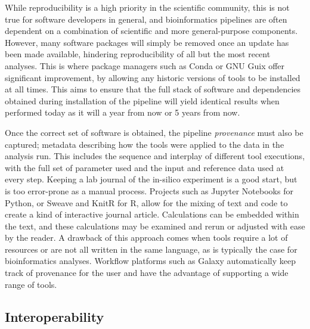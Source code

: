 \begin{justify}
While reproducibility is a high priority in the scientific community, this is not true for software developers in general, and bioinformatics pipelines are often dependent on a combination of scientific and more general-purpose components. However, many software packages will simply be removed once an update has been made available, hindering reproducibility of all but the most recent analyses. This is where package managers such as Conda \cite{conda} or GNU Guix \cite{courtes2013functional} offer significant improvement, by allowing any historic versions of tools to be installed at all times. This aims to ensure that the full stack of software and dependencies obtained during installation of the pipeline will yield identical results when performed today as it will a year from now or 5 years from now.

Once the correct set of software is obtained, the pipeline \emph{provenance} must also be captured; metadata describing how the tools were applied to the data in the analysis run. This includes the sequence and interplay of different tool executions, with the full set of parameter used and the input and reference data used at every step. Keeping a lab journal of the in-silico experiment is a good start, but is too error-prone as a manual process. Projects such as Jupyter Notebooks \cite{kluyver2016jupyter} for Python, or Sweave \cite{leisch2002sweave} and KnitR \cite{xie2014knitr} for R, allow for the mixing of text and code to create a kind of interactive journal article. Calculations can be embedded within the text, and these calculations may be examined and rerun or adjusted with ease by the reader. A drawback of this approach comes when tools require a lot of resources or are not all written in the same language, as is typically the case for bioinformatics analyses. Workflow platforms such as Galaxy automatically keep track of provenance for the user and have the advantage of supporting a wide range of tools.

\subsection{Interoperability}


\end{justify}

